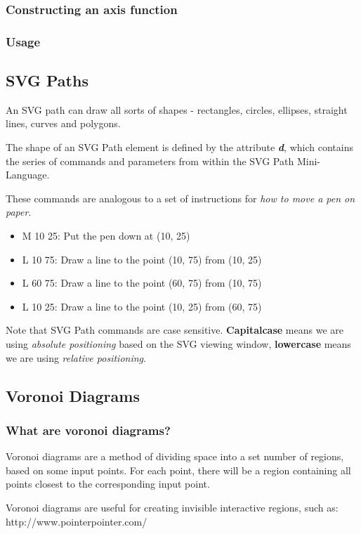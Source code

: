 \documentclass[red]{beamer}
\begin{document}
\begin{frame}
  \frametitle{Constructing an axis function}
  \lstaxis
\end{frame}


\begin{frame}
  \frametitle{Usage}
  \lstcreateaxis
\end{frame}

\subsection{SVG Paths}
\begin{frame}
  An SVG path can draw all sorts of shapes - rectangles, circles, ellipses, straight lines, curves and polygons. 
  \newline

  The shape of an SVG Path element is defined by the attribute \textit{\textbf{d}}, which contains the series of commands and parameters from within the SVG Path Mini-Language. 
  \newline

  These commands are analogous to a set of instructions for \textit{how to move a pen on paper}.
\end{frame}

\begin{frame}
  \lstsvgtriangle
\end{frame}

\begin{frame}
  \begin{itemize}
  \item<1->M 10 25: Put the pen down at (10, 25)
  \item<2->L 10 75: Draw a line to the point (10, 75) from (10, 25)
  \item<3->L 60 75: Draw a line to the point (60, 75) from (10, 75)
  \item<4->L 10 25: Draw a line to the point (10, 25) from (60, 75)
  \end{itemize}

  Note that SVG Path commands are case sensitive. \textbf{Capitalcase} means we are using \textit{absolute positioning} based on the
  SVG viewing window, \textbf{lowercase} means we are using \textit{relative positioning}. 
\end{frame}

\subsection{Voronoi Diagrams}
\begin{frame}
  \frametitle{What are voronoi diagrams?}
  Voronoi diagrams are a method of dividing space into a set number of regions, based on some input points. For each point, there will be a region containing all points closest to the corresponding input point. 
  \newline

  Voronoi diagrams are useful for creating invisible interactive regions, such as: http://www.pointerpointer.com/ 
\end{frame}
\end{document}
